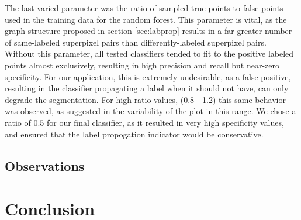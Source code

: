 \documentclass{article} %
\begin{document}
The last varied parameter was the ratio of sampled true points to false points used in the training data for the random forest. This parameter is vital, as the graph structure proposed in section \ref{sec:labprop} results in a far greater number of same-labeled superpixel pairs than differently-labeled superpixel pairs. Without this parameter, all tested classifiers tended to fit to the positive labeled points almost exclusively, resulting in high precision and recall but near-zero specificity. For our application, this is extremely undesirable, as a false-positive, resulting in the classifier propagating a label when it should not have, can only degrade the segmentation. For high ratio values, (0.8 - 1.2) this same behavior was observed, as suggested in the variability of the plot in this range. We chose a ratio of 0.5 for our final classifier, as it resulted in very high specificity values, and ensured that the label propogation indicator would be conservative. 


\subsection{Observations}

\label{sec:Observations}


\section{Conclusion}
\label{sec:Conclusion}



\end{document}
